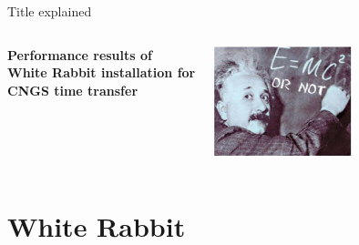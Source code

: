 \documentclass[compress,red]{beamer}
\begin{document}
\begin{frame}{Title explained}

\begin{columns}[c]
    \begin{center}
	\textbf{Performance results of \\White Rabbit installation for \\CNGS time transfer}
    \end{center}
    \begin{center}
      \includegraphics[width=4.0cm]{misc/emc2.png}
    \end{center}
\end{columns}

\end{frame}
\section{White Rabbit}
\end{document}
